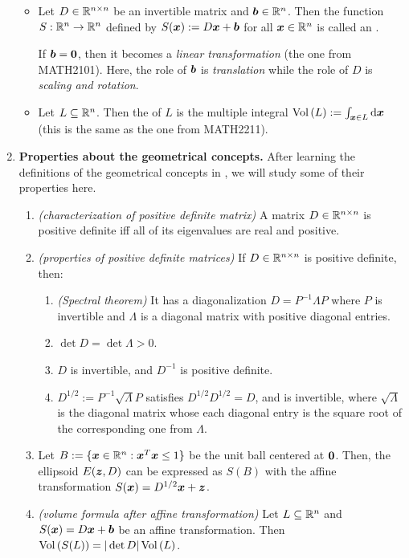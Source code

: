 \begin{enumerate}
\begin{itemize}
\item Let \(D\in\mathbb{R}^{n\times n}\) be an invertible matrix and
\(\bm{b}\in\mathbb{R}^n\). Then the function \(S:\mathbb{R}^n\to\mathbb{R}^n\) defined by
\(S(\bm{x}):=D\bm{x}+\bm{b}\) for all \(\bm{x}\in\mathbb{R}^n\) is called an
.
\begin{note}
If \(\bm{b}=\bm{0}\), then it becomes a \emph{linear transformation} (the
one from MATH2101). Here, the role of \(\bm{b}\) is \emph{translation} while
the role of \(D\) is \emph{scaling and rotation}.
\end{note}
\item Let \(L\subseteq \mathbb{R}^n\). Then the  of \(L\) is the multiple
integral \(\vol{L}:=\int_{\vect{x}\in L}^{}\odif{\vect{x}}\) (this is the same
as the one from MATH2211).
\end{itemize}
\item \label{it:ellip-method-geo-prop} \textbf{Properties about the
geometrical concepts.} After learning the definitions of the geometrical
concepts in , we will study some of
their properties here.
\begin{enumerate}
\item \emph{(characterization of positive definite matrix)} A matrix
\(D\in\mathbb{R}^{n\times n}\) is positive definite iff all of its eigenvalues are
real and positive.
\item \emph{(properties of positive definite matrices)} If \(D\in\mathbb{R}^{n\times
n}\) is positive definite, then:
\begin{enumerate}
\item \emph{(Spectral theorem)} It has a diagonalization \(D=P^{-1}\Lambda P\)
where \(P\) is invertible and \(\Lambda\) is a diagonal matrix with positive
diagonal entries.
\item \(\det{D}=\det{\Lambda}>0\).
\item \(D\) is invertible, and \(D^{-1}\) is positive definite.
\item \(D^{1/2}:=P^{-1}\sqrt{\Lambda}P\) satisfies \(D^{1/2}D^{1/2}=D\), and is
invertible, where \(\sqrt{\Lambda}\) is the diagonal matrix whose each diagonal
entry is the square root of the corresponding one from \(\Lambda\).
\end{enumerate}
\item Let \(B:=\{\bm{x}\in\mathbb{R}^n:\bm{x}^{T}\bm{x}\le 1\}\) be the unit
ball centered at \(\bm{0}\). Then, the ellipsoid \(E(\bm{z},D)\) can be
expressed as \(S(B)\) with the affine transformation
\(S(\bm{x})=D^{1/2}\bm{x}+\bm{z}\).
\item \emph{(volume formula after affine transformation)} Let \(L\subseteq
\mathbb{R}^n\) and \(S(\bm{x})=D\bm{x}+\bm{b}\) be an affine transformation. Then
\(\operatorname{Vol}\left(S(L)\right)=|\det D|\operatorname{Vol}\left(L\right)\).


\end{enumerate}
\end{enumerate}

